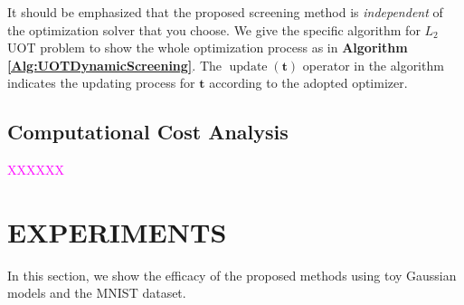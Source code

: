 \documentclass[twoside]{article}
\theoremstyle{plain}
\renewcommand{\vec}[1]{\bm{#1}}
\newcommand{\note}[1]{\textcolor{magenta}{#1}}
\begin{document}
It should be emphasized that the proposed screening method is {\it independent} of the optimization solver that you choose. We give the specific algorithm for $L_2$ UOT problem to show the whole optimization process as in {\bf Algorithm \ref{Alg:UOTDynamicScreening}}. The $\operatorname{update}(\vec{t})$ operator in the algorithm indicates the updating process for $\vec{t}$ according to the adopted optimizer.\\

\subsection{Computational Cost Analysis}

\note{XXXXXX}

\section{EXPERIMENTS}
In this section, we show the efficacy of the proposed methods using toy Gaussian models and the MNIST dataset.
\end{document}
